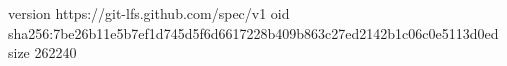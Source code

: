 version https://git-lfs.github.com/spec/v1
oid sha256:7be26b11e5b7ef1d745d5f6d6617228b409b863c27ed2142b1c06c0e5113d0ed
size 262240
